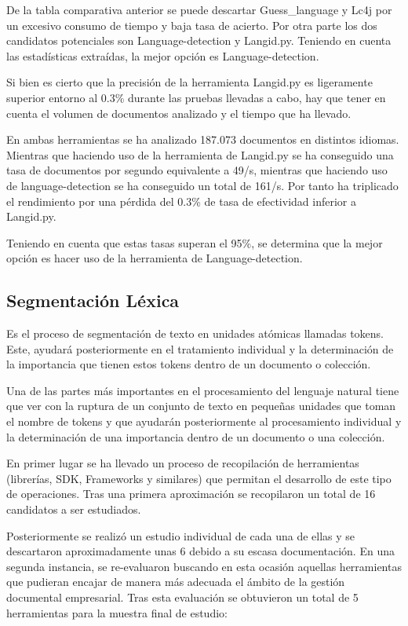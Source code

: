\documentclass[runningheads,a4paper]{llncs}
\theoremstyle{break}
\begin{document}
\vspace{-1.5em}
De la tabla comparativa anterior se puede descartar Guess\_language y Lc4j por un excesivo consumo de tiempo y baja tasa de acierto. Por otra parte los dos candidatos potenciales son Language-detection y Langid.py. Teniendo en cuenta las estadísticas extraídas, la mejor opción es Language-detection.

Si bien es cierto que la precisión de la herramienta Langid.py es ligeramente superior entorno al 0.3\% durante las pruebas llevadas a cabo, hay que tener en cuenta el volumen de documentos analizado y el tiempo que ha llevado.

En ambas herramientas se ha analizado 187.073 documentos en distintos idiomas. Mientras que haciendo uso de la herramienta de Langid.py se ha conseguido una tasa de documentos por segundo equivalente a 49/s, mientras que haciendo uso de language-detection se ha conseguido un total de 161/s. Por tanto ha triplicado el rendimiento por una pérdida del 0.3\% de tasa de efectividad inferior a Langid.py.

Teniendo en cuenta que estas tasas superan el 95\%, se determina que la mejor opción es hacer uso de la herramienta de Language-detection.

\subsection{Segmentación Léxica}

Es el proceso de segmentación de texto en unidades atómicas llamadas tokens. Este, ayudará posteriormente en el tratamiento individual y la determinación de la importancia que tienen estos tokens dentro de un documento o colección.

Una de las partes más importantes en el procesamiento del lenguaje natural tiene que ver con la ruptura de un conjunto de texto en pequeñas unidades que toman el nombre de tokens y que ayudarán posteriormente al procesamiento individual y la determinación de una importancia dentro de un documento o una colección.

En primer lugar se ha llevado un proceso de recopilación de herramientas (librerías, SDK, Frameworks y similares) que permitan el desarrollo de este tipo de operaciones. Tras una primera aproximación se recopilaron un total de 16 candidatos a ser estudiados.

Posteriormente se realizó un estudio individual de cada una de ellas y se descartaron aproximadamente unas 6 debido a su escasa documentación. En una segunda instancia, se re-evaluaron buscando en esta ocasión aquellas herramientas que pudieran encajar de manera más adecuada el ámbito de la gestión documental empresarial. Tras esta evaluación se obtuvieron un total de 5 herramientas para la muestra final de estudio:
\end{document}
